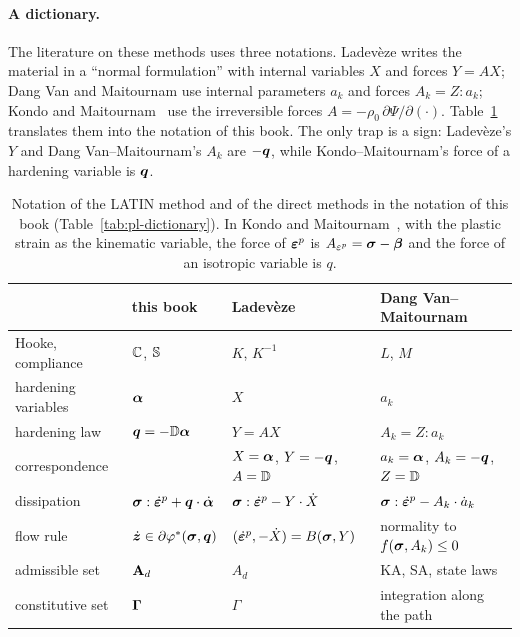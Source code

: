 \paragraph{A dictionary.}
The literature on these methods uses three notations. Ladev\`eze writes the
material in a ``normal formulation'' with internal variables $X$ and forces
$Y=AX$; Dang Van and Maitournam use internal parameters $a_k$ and forces
$A_k=Z:a_k$; Kondo and Maitournam~\cite{KondoMaitournam2023c} use the
irreversible forces $A=-\rho_0\,\partial\Psi/\partial(\cdot)$.
Table~\ref{tab:cy-dictionary} translates them into the notation of this book.
The only trap is a sign: Ladev\`eze's $Y$ and Dang Van--Maitournam's $A_k$ are
$-\bm{q}$, while Kondo--Maitournam's force of a hardening variable is $\bm{q}$.

\begin{table}[h]
\centering\small
\renewcommand{\arraystretch}{1.15}
\begin{tabular}{@{}llll@{}}
\toprule
 & \sffamily this book & \sffamily Ladev\`eze~\cite{LadevezeNCSM} & \sffamily Dang Van--Maitournam~\cite{DangVanMaitournam1993}\\
\midrule
Hooke, compliance & $\mathbb{C}$, $\mathbb{S}$ & $K$, $K^{-1}$ & $L$, $M$\\
hardening variables & $\bm{\alpha}$ & $X$ & $a_k$\\
hardening law & $\bm{q}=-\mathbb{D}\bm{\alpha}$ & $Y=AX$ & $A_k=Z:a_k$\\
correspondence & & $X=\bm{\alpha}$, $Y=-\bm{q}$, $A=\mathbb{D}$ & $a_k=\bm{\alpha}$, $A_k=-\bm{q}$, $Z=\mathbb{D}$\\
dissipation & $\bm{\sigma}:\dot{\bm{\varepsilon}}^p+\bm{q}\cdot\dot{\bm{\alpha}}$ & $\bm{\sigma}:\dot{\bm{\varepsilon}}^p-Y\cdot\dot X$ & $\bm{\sigma}:\dot{\bm{\varepsilon}}^p-A_k\cdot\dot a_k$\\
flow rule & $\dot{\bm{z}}\in\partial\varphi^\ast(\bm{\sigma},\bm{q})$ & $(\dot{\bm{\varepsilon}}^p,-\dot X)=B(\bm{\sigma},Y)$ & normality to $f(\bm{\sigma},A_k)\le0$\\
admissible set & $\mathbf{A}_{d}$ & $A_d$ & KA, SA, state laws\\
constitutive set & $\boldsymbol{\Gamma}$ & $\Gamma$ & integration along the path\\
\bottomrule
\end{tabular}
\caption{Notation of the LATIN method and of the direct methods in the
notation of this book (Table~\ref{tab:pl-dictionary}). In Kondo and
Maitournam~\cite[Sec.~2.6]{KondoMaitournam2023c}, with the plastic strain as
the kinematic variable, the force of $\bm{\varepsilon}^{p}$ is $A_{\varepsilon^p}=\bm{\sigma}-\bm{\beta}$
and the force of an isotropic variable is $q$.}
\label{tab:cy-dictionary}
\end{table}

